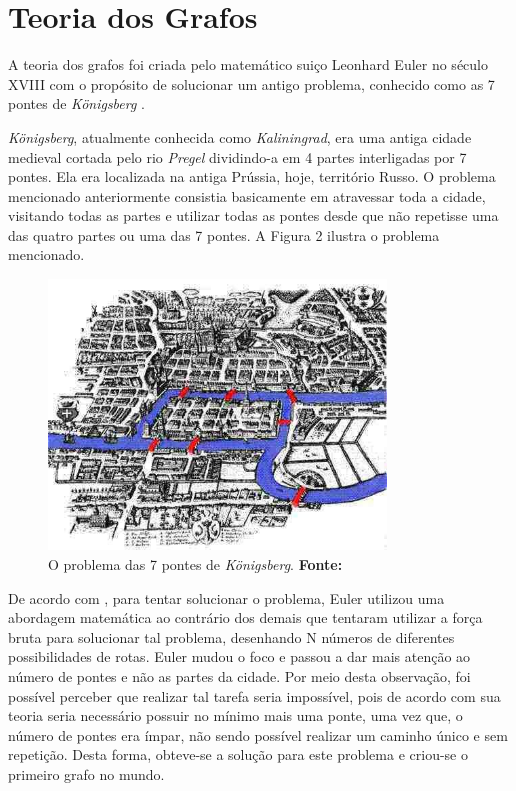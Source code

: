 \section{Teoria dos Grafos}

\par A teoria dos grafos foi criada pelo matemático suiço Leonhard Euler no século XVIII com o propósito de solucionar um antigo problema, conhecido como as 7 pontes de \textit{Königsberg} \cite{harju_graph_theory}.

\par \textit{Königsberg}, atualmente conhecida como \textit{Kaliningrad}, era uma antiga cidade medieval cortada pelo rio \textit{Pregel} dividindo-a em 4 partes interligadas por 7 pontes. Ela era localizada na antiga Prússia, hoje, território Russo. O problema mencionado anteriormente consistia basicamente em atravessar toda a cidade, visitando todas as partes e utilizar todas as pontes desde que não repetisse uma das quatro partes ou uma das 7 pontes. A Figura 2 ilustra o problema mencionado.

\begin{figure}[h!]
	\centerline{\includegraphics[height=0.26\textheight,width=0.8\textwidth]{./imagens/Konigsberg_7_bridges.jpg}}
	\caption[O problema das 7 pontes de \textit{Königsberg} ]
	{O problema das 7 pontes de \textit{Königsberg}. \textbf{Fonte:} }
	\label{fig:exemplo1}
\end{figure}

\par De acordo com , para tentar solucionar o problema, Euler utilizou uma abordagem matemática ao contrário dos demais que tentaram utilizar a força bruta para solucionar tal problema, desenhando N números de diferentes possibilidades de rotas. Euler mudou o foco e passou a dar mais atenção ao número de pontes e não as partes da cidade. Por meio desta observação, foi possível perceber que realizar tal tarefa seria impossível, pois de acordo com sua teoria seria necessário possuir no mínimo mais uma ponte, uma vez que, o número de pontes era ímpar, não sendo possível realizar um caminho único e sem repetição. Desta forma, obteve-se a solução para este problema e criou-se o primeiro grafo no mundo.

